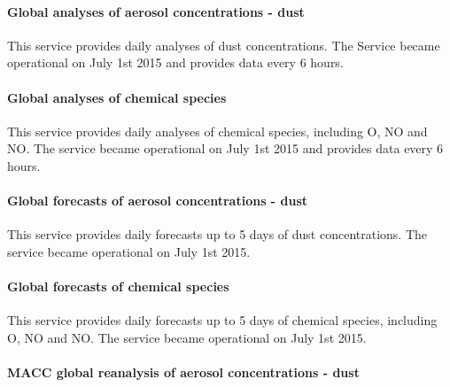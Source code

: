 \documentclass[9pt]{report}
\begin{document}
\paragraph{Global analyses of aerosol concentrations - dust}\label{sec-global-analyses-of-aerosol-concentrations---dust}%

\noindent{}\mdbr
{}This service provides daily analyses of dust concentrations.
The Service became operational on July 1st 2015 and provides data every 6 hours.%

\paragraph{Global analyses of chemical species}\label{sec-global-analyses-of-chemical-species}%

\noindent{}\mdbr
{}This service provides daily analyses of chemical species, including O, NO and NO.
The service became operational on July 1st 2015 and provides data every 6 hours.%

\paragraph{Global forecasts of aerosol concentrations - dust}\label{sec-global-forecasts-of-aerosol-concentrations---dust}%

\noindent{}\mdbr
{}This service provides daily forecasts up to 5 days of dust concentrations.
The service became operational on July 1st 2015.%

\paragraph{Global forecasts of chemical species}\label{sec-global-forecasts-of-chemical-species}%

\noindent{}\mdbr
{}This service provides daily forecasts up to 5 days of chemical species, including O, NO and NO.
The service became operational on July 1st 2015.%

\paragraph{MACC global reanalysis of aerosol concentrations - dust}\label{sec-macc-global-reanalysis-of-aerosol-concentrations---dust}%
\end{document}

